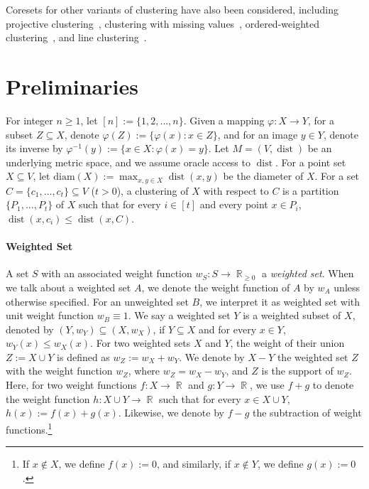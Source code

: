 \documentclass[letterpaper,11pt]{article}
\theoremstyle{plain}
\theoremstyle{definition}
\theoremstyle{remark}
\DeclareMathOperator{\R}{\mathbb{R}}
\DeclareMathOperator{\dist}{dist}
\newcommand{\diam}{\mathrm{diam}}
\renewcommand{\phi}{\varphi}
\begin{document}
Coresets for other variants of clustering have also been considered, including projective clustering~\cite{Feldman11unified,FeldmanSS20Turning,DBLP:conf/aistats/Tukan0ZBF22}, clustering with missing values~\cite{DBLP:conf/nips/BravermanJKW21}, ordered-weighted clustering~\cite{DBLP:conf/icml/BravermanJKW19}, and line clustering~\cite{DBLP:conf/nips/MaromF19, DBLP:conf/nips/LotanSF22}. \section{Preliminaries}
\label{sec:prelim}

For integer $n \geq 1$, let $[n] := \{1,2,\dots,n\}$.
Given a mapping $\phi: X \to Y$, for a subset $Z \subseteq X$, denote $\phi(Z) := \{\phi(x) : x \in Z\}$, and for an image $y \in Y$, denote its inverse by $\phi^{-1}(y) := \{x \in X : \phi(x) = y\}$.
Let $M=(V,\dist)$ be an underlying metric space,
and we assume oracle access to $\dist$.
For a point set $X\subseteq V$, let $\diam(X) := \max_{x,y\in X}\dist(x,y)$ be the diameter of $X$.
For a set $C=\{c_1,\dots,c_t\} \subseteq V$ ($t>0$),
a clustering of $X$ with respect to $C$ is a partition $\{P_1,\ldots,P_t\}$ of $X$ such that for every $i\in [t]$ and every point $x\in P_i$, $\dist(x,c_i) \le \dist(x,C)$.

\paragraph{Weighted Set}
A set $S$ with an associated weight function $w_S : S \to \R_{\ge 0}$ a \emph{weighted set}.
When we talk about a weighted set $A$, we denote the weight function of $A$ by $w_A$ unless otherwise specified. 
For an unweighted set $B$, we interpret it as weighted set with unit weight function $w_{B}\equiv 1$.
We say a weighted set $Y$ is a weighted subset of $X$, denoted by $(Y,w_Y)\subseteq (X,w_X)$,
if $Y\subseteq X$ and for every $x\in Y$, $w_Y(x)\le w_X(x)$. 
For two weighted sets $X$ and $Y$, the weight of their union $Z := X \cup Y$ is defined as $w_Z := w_X + w_Y$. 
We denote by $X - Y$ the weighted set $Z$ with the weight function $w_Z$, where $w_Z = w_X - w_Y$, and $Z$ is the support of $w_Z$.
Here, for two weight functions $f:X\to \R$ and $g:Y\to \R$, we use $f + g$ to denote the weight function $h : X\cup Y\to \R$ such that for every $x\in X\cup Y$, $h(x) := f(x) + g(x)$. 
Likewise, we denote by $f-g$ the subtraction of weight functions.\footnote{If $x \not\in X$, we define $f(x) := 0$, and similarly, if $x \not\in Y$, we define $g(x) := 0$.}
\end{document}
